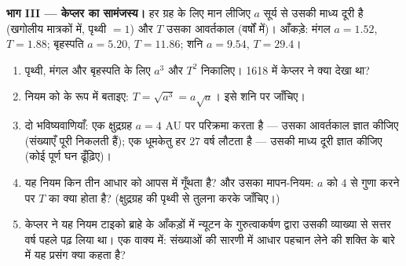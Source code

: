 \begin{problem}
\medskip
\noindent\textbf{भाग III --- केप्लर का सामंजस्य।}
हर ग्रह के लिए मान लीजिए $a$ सूर्य से उसकी माध्य दूरी है (खगोलीय मात्रकों
में, पृथ्वी $= 1$) और $T$ उसका आवर्तकाल (वर्षों में)। आँकड़े: मंगल $a = 1.52$,
$T = 1.88$; बृहस्पति $a = 5.20$, $T = 11.86$; शनि $a = 9.54$, $T = 29.4$।
\begin{enumerate}[resume]
  \item पृथ्वी, मंगल और बृहस्पति के लिए $a^3$ और $T^2$ निकालिए। 1618 में
        केप्लर ने क्या देखा था?
  \item नियम को  के रूप में बताइए: $T = \sqrt{a^3} = a\sqrt a$। इसे शनि पर जाँचिए।
  \item दो भविष्यवाणियाँ: एक क्षुद्रग्रह $a = 4$ AU पर परिक्रमा करता है ---
        उसका आवर्तकाल ज्ञात कीजिए (संख्याएँ पूरी निकलती हैं); एक धूमकेतु
        हर $27$ वर्ष लौटता है --- उसकी माध्य दूरी ज्ञात कीजिए (कोई पूर्ण
        घन ढूँढ़िए)।
  \item यह नियम किन तीन आधार  को आपस में गूँथता है? और उसका मापन-नियम:
        $a$ को $4$ से गुणा करने पर $T$ का क्या होता है? (क्षुद्रग्रह
        की पृथ्वी से तुलना करके जाँचिए।)
  \item केप्लर ने यह नियम टाइको ब्राहे के आँकड़ों में न्यूटन के गुरुत्वाकर्षण
        द्वारा उसकी व्याख्या से सत्तर वर्ष पहले पढ़ लिया था। एक वाक्य में:
        संख्याओं की सारणी में आधार  पहचान लेने की शक्ति के बारे में यह
        प्रसंग क्या कहता है?
\end{enumerate}


\end{problem}
